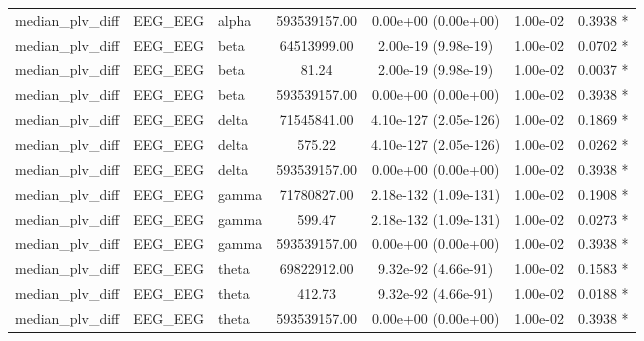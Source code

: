 \begin{tabular}{l l l c c c c}
    median\_plv\_diff & EEG\_EEG & alpha & 593539157.00 & 0.00e+00 (0.00e+00) & 1.00e-02 & 0.3938 * \\
    median\_plv\_diff & EEG\_EEG & beta & 64513999.00 & 2.00e-19 (9.98e-19) & 1.00e-02 & 0.0702 * \\
    median\_plv\_diff & EEG\_EEG & beta & 81.24 & 2.00e-19 (9.98e-19) & 1.00e-02 & 0.0037 * \\
    median\_plv\_diff & EEG\_EEG & beta & 593539157.00 & 0.00e+00 (0.00e+00) & 1.00e-02 & 0.3938 * \\
    median\_plv\_diff & EEG\_EEG & delta & 71545841.00 & 4.10e-127 (2.05e-126) & 1.00e-02 & 0.1869 * \\
    median\_plv\_diff & EEG\_EEG & delta & 575.22 & 4.10e-127 (2.05e-126) & 1.00e-02 & 0.0262 * \\
    median\_plv\_diff & EEG\_EEG & delta & 593539157.00 & 0.00e+00 (0.00e+00) & 1.00e-02 & 0.3938 * \\
    median\_plv\_diff & EEG\_EEG & gamma & 71780827.00 & 2.18e-132 (1.09e-131) & 1.00e-02 & 0.1908 * \\
    median\_plv\_diff & EEG\_EEG & gamma & 599.47 & 2.18e-132 (1.09e-131) & 1.00e-02 & 0.0273 * \\
    median\_plv\_diff & EEG\_EEG & gamma & 593539157.00 & 0.00e+00 (0.00e+00) & 1.00e-02 & 0.3938 * \\
    median\_plv\_diff & EEG\_EEG & theta & 69822912.00 & 9.32e-92 (4.66e-91) & 1.00e-02 & 0.1583 * \\
    median\_plv\_diff & EEG\_EEG & theta & 412.73 & 9.32e-92 (4.66e-91) & 1.00e-02 & 0.0188 * \\
    median\_plv\_diff & EEG\_EEG & theta & 593539157.00 & 0.00e+00 (0.00e+00) & 1.00e-02 & 0.3938 * \\
    \bottomrule
\end{tabular}
